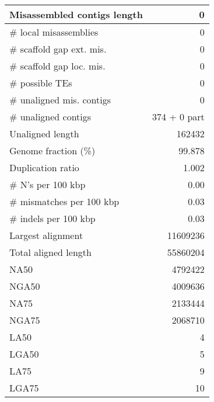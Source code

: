 \documentclass[12pt,a4paper]{article}
\begin{document}
\begin{table}[ht]
\begin{center}
\begin{tabular}{|l*{1}{|r}|}
Misassembled contigs length & 0 \\ \hline
\# local misassemblies & 0 \\ \hline
\# scaffold gap ext. mis. & 0 \\ \hline
\# scaffold gap loc. mis. & 0 \\ \hline
\# possible TEs & 0 \\ \hline
\# unaligned mis. contigs & 0 \\ \hline
\# unaligned contigs & 374 + 0 part \\ \hline
Unaligned length & 162432 \\ \hline
Genome fraction (\%) & 99.878 \\ \hline
Duplication ratio & 1.002 \\ \hline
\# N's per 100 kbp & 0.00 \\ \hline
\# mismatches per 100 kbp & 0.03 \\ \hline
\# indels per 100 kbp & 0.03 \\ \hline
Largest alignment & 11609236 \\ \hline
Total aligned length & 55860204 \\ \hline
NA50 & 4792422 \\ \hline
NGA50 & 4009636 \\ \hline
NA75 & 2133444 \\ \hline
NGA75 & 2068710 \\ \hline
LA50 & 4 \\ \hline
LGA50 & 5 \\ \hline
LA75 & 9 \\ \hline
LGA75 & 10 \\ \hline
\end{tabular}
\end{center}
\end{table}
\end{document}
